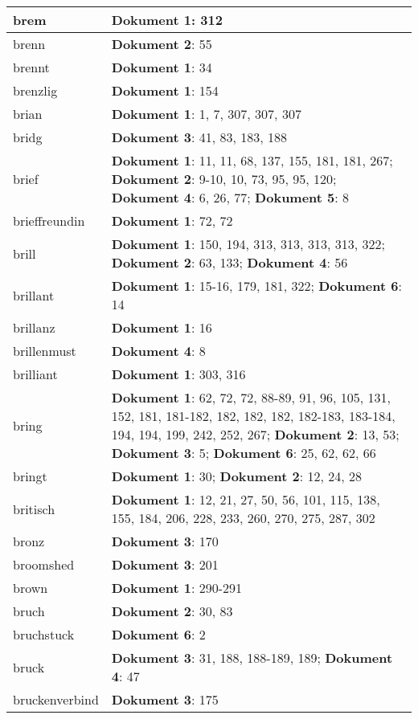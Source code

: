 \documentclass[a5paper]{article}
\begin{document}
\begin{longtable}[l]{|l|p{3in}|}
brem & \textbf{Dokument 1}: 312 \\
\hline
brenn & \textbf{Dokument 2}: 55 \\
\hline
brennt & \textbf{Dokument 1}: 34 \\
\hline
brenzlig & \textbf{Dokument 1}: 154 \\
\hline
brian & \textbf{Dokument 1}: 1, 7, 307, 307, 307 \\
\hline
bridg & \textbf{Dokument 3}: 41, 83, 183, 188 \\
\hline
brief & \textbf{Dokument 1}: 11, 11, 68, 137, 155, 181, 181, 267; \textbf{Dokument 2}: 9-10, 10, 73, 95, 95, 120; \textbf{Dokument 4}: 6, 26, 77; \textbf{Dokument 5}: 8 \\
\hline
brieffreundin & \textbf{Dokument 1}: 72, 72 \\
\hline
brill & \textbf{Dokument 1}: 150, 194, 313, 313, 313, 313, 322; \textbf{Dokument 2}: 63, 133; \textbf{Dokument 4}: 56 \\
\hline
brillant & \textbf{Dokument 1}: 15-16, 179, 181, 322; \textbf{Dokument 6}: 14 \\
\hline
brillanz & \textbf{Dokument 1}: 16 \\
\hline
brillenmust & \textbf{Dokument 4}: 8 \\
\hline
brilliant & \textbf{Dokument 1}: 303, 316 \\
\hline
bring & \textbf{Dokument 1}: 62, 72, 72, 88-89, 91, 96, 105, 131, 152, 181, 181-182, 182, 182, 182, 182-183, 183-184, 194, 194, 199, 242, 252, 267; \textbf{Dokument 2}: 13, 53; \textbf{Dokument 3}: 5; \textbf{Dokument 6}: 25, 62, 62, 66 \\
\hline
bringt & \textbf{Dokument 1}: 30; \textbf{Dokument 2}: 12, 24, 28 \\
\hline
britisch & \textbf{Dokument 1}: 12, 21, 27, 50, 56, 101, 115, 138, 155, 184, 206, 228, 233, 260, 270, 275, 287, 302 \\
\hline
bronz & \textbf{Dokument 3}: 170 \\
\hline
broomshed & \textbf{Dokument 3}: 201 \\
\hline
brown & \textbf{Dokument 1}: 290-291 \\
\hline
bruch & \textbf{Dokument 2}: 30, 83 \\
\hline
bruchstuck & \textbf{Dokument 6}: 2 \\
\hline
bruck & \textbf{Dokument 3}: 31, 188, 188-189, 189; \textbf{Dokument 4}: 47 \\
\hline
bruckenverbind & \textbf{Dokument 3}: 175 \\

\end{longtable}
\end{document}
